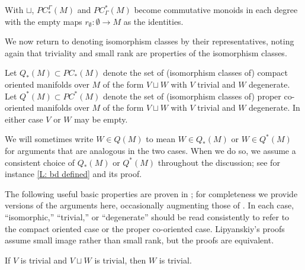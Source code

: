 With $\sqcup$, $PC^\Gamma_*(M)$ and $PC_\Gamma^*(M)$ become commutative monoids in each degree with the empty maps $r_\emptyset \colon \emptyset \to M$ as the identities.

We now return to denoting isomorphism classes by their representatives, noting again that triviality and small rank are properties of the isomorphism classes.

\begin{definition}
	Let $Q_*(M) \subset PC_*(M)$ denote the set of (isomorphism classes of) compact oriented manifolds over $M$ of the form $V \sqcup W$ with $V$ trivial and $W$ degenerate.
	Let $Q^*(M) \subset PC^*(M)$ denote the set of (isomorphism classes of) proper co-oriented manifolds over $M$ of the form $V \sqcup W$ with $V$ trivial and $W$ degenerate.
	In either case $V$ or $W$ may be empty.

	We will sometimes write $W \in Q(M)$ to mean $W \in Q_*(M)$ or $W \in Q^*(M)$ for arguments that are analogous in the two cases.
	When we do so, we assume a consistent choice of $Q_*(M)$ or $Q^*(M)$ throughout the discussion; see for instance \cref{L: bd defined} and its proof.
\end{definition}

The following useful basic properties are proven in \cite{Lipy14}; for completeness we provide versions of the arguments here, occasionally augmenting those of \cite{Lipy14}.
In each case, ``isomorphic,'' ``trivial,'' or ``degenerate'' should be read consistently to refer to the compact oriented case or the proper co-oriented case.
Lipyanskiy's proofs assume small image rather than small rank, but the proofs are equivalent.

\begin{lemma}\label{L: Lip L10}
	If $V$ is trivial and $V \sqcup W$ is trivial, then $W$ is trivial.
\end{lemma}

